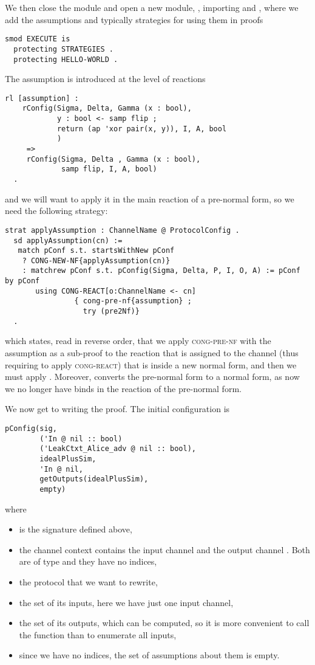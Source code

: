 We then close the  module and
open a new module, , importing  and
, where we add the assumptions and typically strategies
for using them in proofs
\begin{lstlisting}
smod EXECUTE is
  protecting STRATEGIES .
  protecting HELLO-WORLD .
\end{lstlisting}

The assumption is introduced at the level of reactions
\begin{lstlisting}
rl [assumption] :
    rConfig(Sigma, Delta, Gamma (x : bool),
            y : bool <- samp flip ; 
            return (ap 'xor pair(x, y)), I, A, bool
            )
     => 
     rConfig(Sigma, Delta , Gamma (x : bool),
             samp flip, I, A, bool)
  .  
\end{lstlisting}
\noindent and we will want to apply it in the 
main reaction of a pre-normal form, so we need the following strategy:
\begin{lstlisting}
strat applyAssumption : ChannelName @ ProtocolConfig .
  sd applyAssumption(cn) := 
   match pConf s.t. startsWithNew pConf
    ? CONG-NEW-NF{applyAssumption(cn)}
    : matchrew pConf s.t. pConfig(Sigma, Delta, P, I, O, A) := pConf by pConf 
       using CONG-REACT[o:ChannelName <- cn]
                { cong-pre-nf{assumption} ; 
                  try (pre2Nf)}   
  .
\end{lstlisting}
\noindent which states, read in reverse order, that we apply 
\textsc{cong-pre-nf} with the assumption as a sub-proof 
to the reaction  that is assigned to the channel 
(thus requiring to apply \textsc{cong-react}) 
that is inside a new normal form, and then we must apply
. Moreover,  converts the
pre-normal form to a normal form, as now we no longer have binds in the
reaction of the pre-normal form.

We now get to writing the proof. The initial configuration is
\begin{lstlisting}
pConfig(sig, 
        ('In @ nil :: bool) 
        ('LeakCtxt_Alice_adv @ nil :: bool), 
        idealPlusSim, 
        'In @ nil, 
        getOutputs(idealPlusSim), 
        empty)
\end{lstlisting}
\noindent where 
\begin{itemize}
 \item {} is the signature defined above,
 \item the channel context contains the input channel 
       and the output channel . Both are of type
        and they have no indices,
 \item the protocol that we want to rewrite,
 \item the set of its inputs, here we have just one input channel,      
 \item the set of its outputs, which can be computed, so it is more
       convenient to call the function  than to
       enumerate all inputs,
 \item since we have no indices, the set of assumptions about them is empty.      
\end{itemize}

